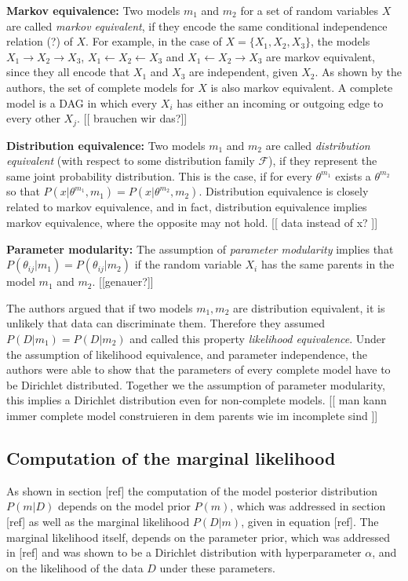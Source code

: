 \documentclass{article}
\begin{document}
	\textbf{Markov equivalence:}
	Two models $m_1$ and $m_2$ for a set of random variables $X$ are called \textit{markov equivalent},
	if they encode the same conditional independence relation (?) of $X$. For example, in the case of
	$X=\{X_1,X_2,X_3\}$, the models $X_1 \rightarrow X_2 \rightarrow X_3$,
	$X_1 \leftarrow X_2 \leftarrow X_3$ and $X_1 \leftarrow X_2 \rightarrow X_3$ are 
	markov equivalent, since they all encode that $X_1$ and $X_3$ are independent, given $X_2$.
	As shown by the authors, the set of complete models for $X$ is also markov equivalent. 
	A complete model is a DAG in which every $X_i$ has either an 	incoming or outgoing edge 
	to every other $X_j$. [[ brauchen wir das?]]
	
	\textbf{Distribution equivalence:}
	Two models $m_1$ and $m_2$ are called \textit{distribution equivalent} (with respect to some distribution
	family $\mathcal{F}$), if they represent the same
	joint probability distribution. This is the case, if for every $\theta^{m_1}$ exists a $\theta^{m_2}$
	so that $P(x|\theta^{m_1},m_1) = P(x|\theta^{m_2},m_2)$. Distribution equivalence is closely related
	to markov equivalence, and in fact, distribution equivalence implies markov equivalence, where the
	opposite may not hold. [[ data instead of x? ]]
	
	\textbf{Parameter modularity:}
	The assumption of \textit{parameter modularity} implies that $P(\theta_{ij}|m_1) = P(\theta_{ij}|m_2)$
	if the random variable $X_i$ has the same parents in the model $m_1$ and $m_2$. [[genauer?]]
	
	The authors argued that if two models $m_1,m_2$ are distribution equivalent, it is unlikely that data can
	discriminate them. Therefore they assumed $P(D|m_1)=P(D|m_2)$ and called this
	property \textit{likelihood equivalence}.
	Under the assumption of likelihood equivalence, and	parameter independence, the authors were able to
	show that the parameters of every complete model have to be Dirichlet distributed. Together we
	the assumption of parameter modularity, this implies a Dirichlet distribution even for non-complete
	models. [[ man kann immer complete model construieren in dem parents wie im incomplete sind ]]
	
	\subsection{Computation of the marginal likelihood}
	As shown in section [ref] the computation of the model posterior distribution $P(m|D)$ depends on
	the model prior $P(m)$,	which was addressed in section [ref] as well as the marginal likelihood $P(D|m)$,
	given in equation [ref]. The marginal likelihood itself, depends on the parameter prior, which was
	addressed in [ref] and was shown to be a Dirichlet distribution with hyperparameter $\alpha$, and on
	the likelihood of the data $D$ under these parameters.
	
\end{document}
